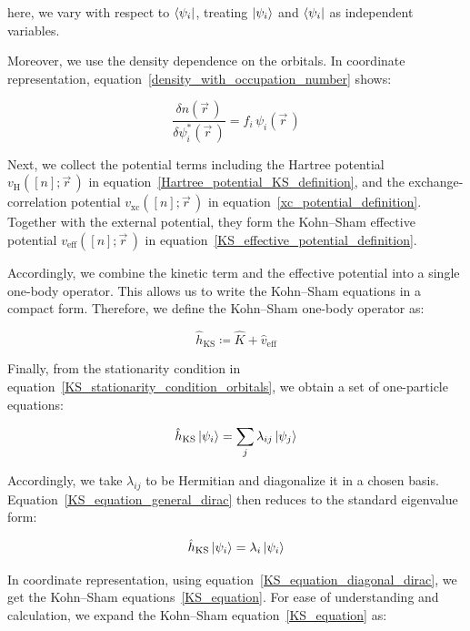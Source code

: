 here, we vary with respect to $\bra{\psi_i}$, treating $\ket{\psi_i}$ and $\bra{\psi_i}$ as independent variables.

Moreover, we use the density dependence on the orbitals.
In coordinate representation, equation~\eqref{density_with_occupation_number} shows:

\begin{equation}
    \frac{\delta n(\vec{r}\,)}{\delta \psi_i^\ast(\vec{r}\,)}
    =f_i\,\psi_i(\vec{r}\,)
\label{KS_density_orbital_derivative}
\end{equation}

Next, we collect the potential terms including
the Hartree potential $v_\mathrm{H}([n];\vec{r}\,)$ in equation~\eqref{Hartree_potential_KS_definition},
and the exchange-correlation potential $v_\mathrm{xc}([n];\vec{r}\,)$ in equation~\eqref{xc_potential_definition}.
Together with the external potential, they form the Kohn--Sham effective potential $v_\mathrm{eff}([n];\vec{r}\,)$ in equation~\eqref{KS_effective_potential_definition}.

Accordingly, we combine the kinetic term and the effective potential into a single one-body operator.
This allows us to write the Kohn--Sham equations in a compact form.
Therefore, we define the Kohn--Sham one-body operator as:

\begin{equation}
    \hat{h}_\mathrm{KS}\coloneqq
    \hat{K}+\hat{v}_\mathrm{eff}
\label{KS_one_body_hamiltonian_definition}
\end{equation}

Finally, from the stationarity condition in equation~\eqref{KS_stationarity_condition_orbitals},
we obtain a set of one-particle equations:

\begin{equation}
    \hat{h}_\mathrm{KS}\ket{\psi_i} =
    \sum_j\lambda_{ij}\ket{\psi_j}
\label{KS_equation_general_dirac}
\end{equation}

Accordingly, we take $\lambda_{ij}$ to be Hermitian and diagonalize it in a chosen basis.
Equation~\eqref{KS_equation_general_dirac} then reduces to the standard eigenvalue form:

\begin{equation}
    \hat{h}_\mathrm{KS}\ket{\psi_i} =
    \lambda_i\ket{\psi_i}
\label{KS_equation_diagonal_dirac}
\end{equation}

In coordinate representation, using equation~\eqref{KS_equation_diagonal_dirac}, we get the Kohn--Sham equations~\eqref{KS_equation}.
For ease of understanding and calculation, we expand the Kohn--Sham equation~\eqref{KS_equation} as:

